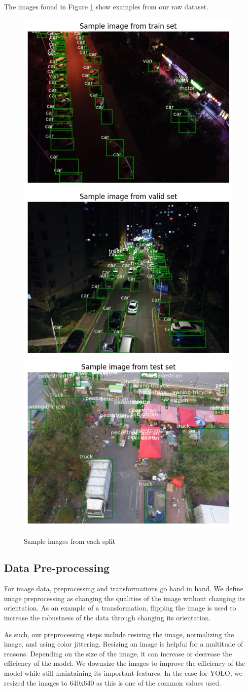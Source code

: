 \documentclass[stu,12pt,floatsintext]{apa7}
\begin{document}

The images found in Figure \ref{fig:sample_images} show examples from our raw dataset.
\begin{figure}
	\centering
	\includegraphics[width=0.33\linewidth]{images/sample_train.png}
	\includegraphics[width=0.33\linewidth]{images/sample_valid.png}
	\includegraphics[width=0.32\linewidth]{images/sample_test.png}
	\caption{Sample images from each split}
	\label{fig:sample_images}
\end{figure}


\subsection{Data Pre-processing}
For image data, preprocessing and transformations go hand in hand. We define image preprocessing as changing the qualities of the image without changing its orientation. As an example of a transformation, flipping the image is used to increase the robustness of the data through changing its orientation.

As such, our preprocessing steps include resizing the image, normalizing the image, and using color jittering. Resizing an image is helpful for a multitude of reasons. Depending on the size of the image, it can increase or decrease the efficiency of the model. We downsize the images to improve the efficiency of the model while still maintaining its important features. In the case for YOLO, we resized the images to 640x640 as this is one of the common values used.
\end{document}
